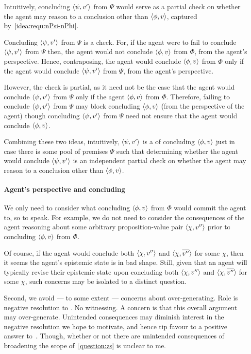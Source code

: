 \begin{note}
  Intuitively, concluding \(\langle \psi, v' \rangle\) from \(\Psi\) would serve as a partial check on whether the agent may reason to a conclusion other than \(\langle \phi, v \rangle\), captured by~\ref{idea:requ:nPsi-nPhi}.

  Concluding \(\langle \psi, v' \rangle\) from \(\Psi\) is a check.
  For, if the agent were to fail to conclude \(\langle \psi, v' \rangle\) from \(\Psi\) then, the agent would not conclude \(\langle \phi, v \rangle\) from \(\Phi\), from the agent's perspective.
  Hence, contraposing, the agent would conclude \(\langle \phi, v \rangle\) from \(\Phi\) only if the agent would conclude \(\langle \psi, v' \rangle\) from \(\Psi\), from the agent's perspective.

  However, the check is partial, as it need not be the case that the agent would conclude \(\langle \psi, v' \rangle\) from \(\Psi\) only if the agent \(\langle \phi, v \rangle\) from \(\Phi\).
  Therefore, failing to conclude \(\langle \psi, v' \rangle\) from \(\Psi\) may block concluding \(\langle \phi, v \rangle\) (from the perspective of the agent) though concluding \(\langle \psi, v' \rangle\) from \(\Psi\) need not ensure that the agent would conclude \(\langle \phi, v \rangle\).

  Combining these two ideas, intuitively, \(\langle \psi, v' \rangle\) is a \requ{} of concluding \(\langle \phi, v \rangle\) just in case there is some pool of premises \(\Psi\) such that determining whether the agent would conclude \(\langle \psi, v' \rangle\) is an independent partial check on whether the agent may reason to a conclusion other than \(\langle \phi, v \rangle\).
\end{note}

\paragraph{Agent's perspective and concluding}

\begin{note}
  We only need to consider what concluding \(\langle \phi, v \rangle\) from \(\Phi\) would commit the agent to, so to speak.
  For example, we do not need to consider the consequences of the agent reasoning about some arbitrary proposition-value pair \(\langle \chi, v'' \rangle\) prior to concluding \(\langle \phi, v \rangle\) from \(\Phi\).

  Of course, if the agent would conclude both \(\langle \chi, v'' \rangle\) and \(\langle \chi, \overline{v''} \rangle\) for some \(\chi\), then it seems the agent's epistemic state is in bad shape.
  Still, given that an agent will typically revise their epistemic state upon concluding both \(\langle \chi, v'' \rangle\) and \(\langle \chi, \overline{v''} \rangle\) for some \(\chi\), such concerns may be isolated to a distinct question.

  Second, we avoid --- to some extent --- concerns about over-generating.
  Role is negative resolution to \issueConstraint{}.
  No witnessing.
  A concern is that this overall argument may over-generate.
  Unintended consequences may diminish interest in the negative resolution we hope to motivate, and hence tip favour to a positive answer to~\issueConstraint{}.
  Though, whether or not there are unintended consequences of broadening the scope of~\autoref{question:zs} is unclear to me.
\end{note}

